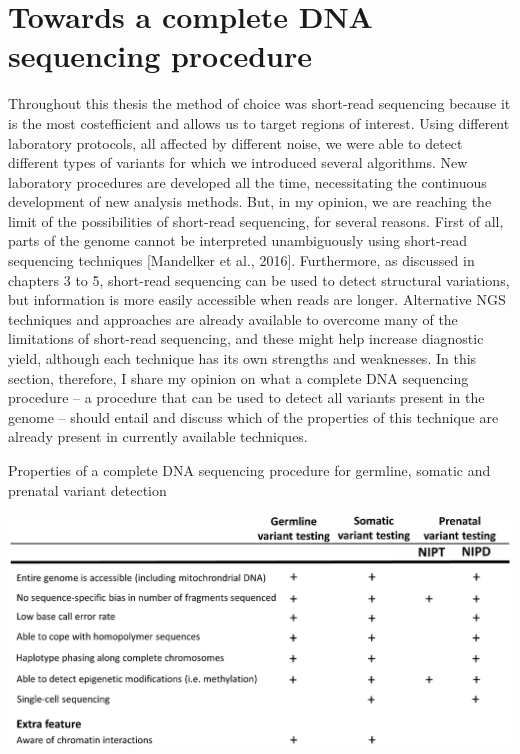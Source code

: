 \section{Towards a complete DNA sequencing procedure}\label{complete}
Throughout this thesis the method of choice was short-read sequencing because it is the most costefficient and allows us to target regions of interest. 
Using different laboratory protocols, all affected by different noise, we were able to detect different types of variants for which we introduced several algorithms. 
New laboratory procedures are developed all the time, necessitating the continuous development of new analysis methods. 
But, in my opinion, we are reaching the limit of the possibilities of short-read sequencing, for several reasons. 
First of all, parts of the genome cannot be interpreted unambiguously using short-read sequencing techniques [Mandelker et al., 2016].
Furthermore, as discussed in chapters 3 to 5, short-read sequencing can be used to detect structural variations, but information is more easily accessible when reads are longer. 
Alternative NGS techniques and approaches are already available to overcome many of the limitations of short-read sequencing, and these might help increase diagnostic yield, although each technique has its own
strengths and weaknesses. 
In this section, therefore, I share my opinion on what a complete DNA sequencing procedure – a procedure that can be used to detect all variants present in the genome – should entail and discuss which of the properties of this technique are already present in currently available techniques. 

\begin{table}
	\caption[Properties of a complete DNA sequencing procedure for germline, somatic and prenatal variant detection]{Properties of a complete DNA sequencing procedure for germline, somatic and prenatal variant detection}
	\includegraphics[width=1.0\linewidth]{img/Chapter11_table1}
	\label{table:Chapter11_table2}
\end{table}

